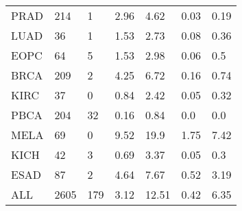 \documentclass[a4paper,10pt]{article}
\begin{document}
\begin{table}[]
\begin{tabular}{l|l|l|l|l|l|l}
PRAD&214&1&2.96&4.62&0.03&0.19\\
LUAD&36&1&1.53&2.73&0.08&0.36\\
EOPC&64&5&1.53&2.98&0.06&0.5\\
BRCA&209&2&4.25&6.72&0.16&0.74\\
KIRC&37&0&0.84&2.42&0.05&0.32\\
PBCA&204&32&0.16&0.84&0.0&0.0\\
MELA&69&0&9.52&19.9&1.75&7.42\\
KICH&42&3&0.69&3.37&0.05&0.3\\
ESAD&87&2&4.64&7.67&0.52&3.19\\
\hline
ALL&2605&179&3.12&12.51&0.42&6.35\\

\end{tabular}
\end{table}
\end{document}
